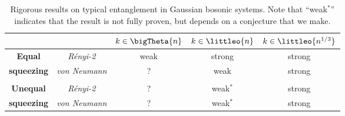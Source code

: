 \setlength{\tabcolsep}{20pt}

\begin{table}
    \centering
    \begin{tabular}{ccccc}
         \toprule
         & & $k \in \bigTheta{n}$ & $k \in \littleo{n}$ & $k \in \littleo{n^{1/3}}$ \cite{fukuda_typical_2019} \\
        \midrule
         \textbf{Equal} & \textit{R\'enyi-2} & weak & strong & strong\\
         \textbf{squeezing} & \textit{von Neumann} & ? & weak & strong \\\\
         \textbf{Unequal} & \textit{R\'enyi-2} & ? & weak${}^\ast$ & strong \\
         \textbf{squeezing} & \textit{von Neumann} & ? & weak${}^\ast$ & strong \\
        \bottomrule
    \end{tabular}
    \caption{
    Rigorous results on typical entanglement in Gaussian bosonic systems. Note that ``weak${}^\ast$'' indicates that the result is not fully proven, but depends on a conjecture that we make.
    }
    \label{tab:typicality}
\end{table}
%